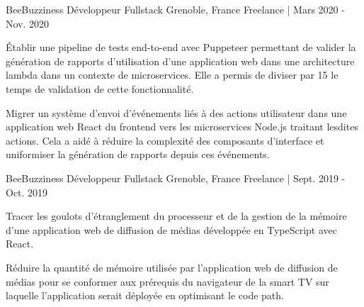 

\begin{cventries}

  \cventry
  	{BeeBuzziness} %
    {Développeur Fullstack} %
    {Grenoble, France} %
    {Freelance | Mars 2020 - Nov. 2020} %
    {
      \begin{cvitems} %
        \item {Établir une pipeline de tests end-to-end avec Puppeteer permettant de valider la génération de rapports d'utilisation d'une application web dans une architecture lambda dans un contexte de microservices.  
        Elle a permis de diviser par 15 le temps de validation de cette fonctionnalité.}
        \item {Migrer un système d'envoi d'événements liés à des actions utilisateur dans une application web React du frontend vers les microservices Node.js traitant lesdites actions.
        Cela a aidé à réduire la complexité des composants d'interface et uniformiser la génération de rapports depuis ces événements.}
      \end{cvitems}
    }

  \cventry
  	{BeeBuzziness} %
    {Développeur Fullstack} %
    {Grenoble, France} %
    {Freelance | Sept. 2019 - Oct. 2019} %
    {
      \begin{cvitems} %
        \item {Tracer les goulots d'étranglement du processeur et de la gestion de la mémoire d'une application web de diffusion de médias développée en TypeScript avec React.}
        \item {Réduire la quantité de mémoire utilisée par l'application web de diffusion de médias pour se conformer aux prérequis du navigateur de la smart TV sur laquelle l'application serait déployée en optimisant le code path.}
      \end{cvitems}
    }


\end{cventries}
